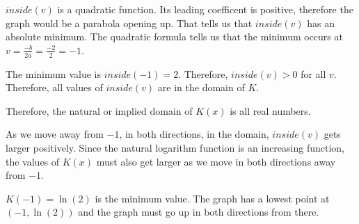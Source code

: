 \documentclass{ximera}
\begin{document}
$inside(v)$ is a quadratic function.  Its leading coefficent is positive, therefore the graph would be a parabola opening up.  That tells us that $inside(v)$ has an absolute minimum.  The quadratic formula tells us that the minimum occurs at $v=\frac{-b}{2a} = \frac{-2}{2} = -1$.

The minimum value is $inside(-1) = 2$.  Therefore, $inside(v) > 0$ for all $v$. Therefore, all values of $inside(v)$ are in the domain of $K$.

Therefore, the natural or implied domain of $K(x)$ is all real numbers.


As we move away from $-1$, in both directions, in the domain, $inside(v)$ gets larger positively. Since the natural logarithm function is an increasing function, the values of $K(x)$ must also get larger as we move in both directions away from $-1$.


$K(-1) = \ln(2)$ is the minimum value.  The graph has a lowest point at $(-1, \ln(2))$ and the graph must go up in both directions from there.








\begin{image}
\end{image}
\end{document}
